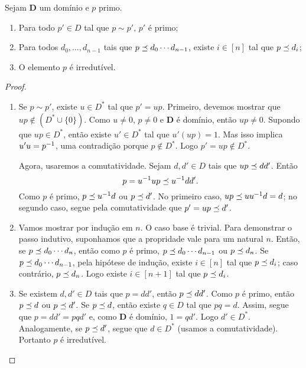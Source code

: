 \begin{proposition}
Sejam $\bm D$ um domínio e $p$ primo.
	\begin{enumerate}
	\item Para todo $p' \in D$ tal que $p \sim p'$, $p'$ é primo;
	\item Para todos $d_0,\ldots,d_{n-1}$ tais que $p \preceq d_0 \cdots d_{n-1}$, existe $i \in [n]$ tal que $p \preceq d_i$;
	\item O elemento $p$ é irredutível.
	\end{enumerate}
\end{proposition}
\begin{proof}
	\begin{enumerate}
	\item Se $p \sim p'$, existe $u \in D^*$ tal que $p'=up$. Primeiro, devemos mostrar que $up \notin (D^* \cup \{0\})$. Como $u \neq 0$, $p \neq 0$ e $\bm D$ é domínio, então $up \neq 0$. Supondo que $up \in D^*$, então existe $u' \in D^*$ tal que $u'(up)=1$. Mas isso implica $u'u=p^{-1}$, uma contradição porque $p \notin D^*$. Logo $p'=up \notin D^*$.
	
Agora, usaremos a comutatividade. Sejam $d,d' \in D$ tais que $up \preceq dd'$. Então
	\begin{equation*}
	p = u^{-1} up \preceq u^{-1} dd'.
	\end{equation*}
Como $p$ é primo, $p \preceq u^{-1} d$ ou $p \preceq d'$. No primeiro caso, $up \preceq uu^{-1} d=d$; no segundo caso, segue pela comutatividade que $p'=up \preceq d'$.
	
	\item Vamos mostrar por indução em $n$. O caso base é trivial. Para demonstrar o passo indutivo, suponhamos que a propridade vale para um natural $n$. Então, se $p \preceq d_0 \cdots d_n$, então como $p$ é primo, $p \preceq d_0 \cdots d_{n-1}$ ou $p \preceq d_n$. Se $p \preceq d_0 \cdots d_{n-1}$, pela hipótese de indução, existe $i \in [n]$ tal que $p \preceq d_i$; caso contrário, $p \preceq d_n$. Logo existe $i \in [n+1]$ tal que $p \preceq d_i$.
	
	\item Se existem $d,d' \in D$ tais que $p=dd'$, então $p \preceq dd'$. Como $p$ é primo, então $p \preceq d$ ou $p \preceq d'$. Se $p \preceq d$, então existe $q \in D$ tal que $pq=d$. Assim, segue que $p=dd'=pqd'$ e, como $\bm D$ é domínio, $1=qd'$. Logo $d' \in D^*$. Analogamente, se $p \preceq d'$, segue que $d \in D^*$ (usamos a comutatividade). Portanto $p$ é irredutível.
	\end{enumerate}
\end{proof}

